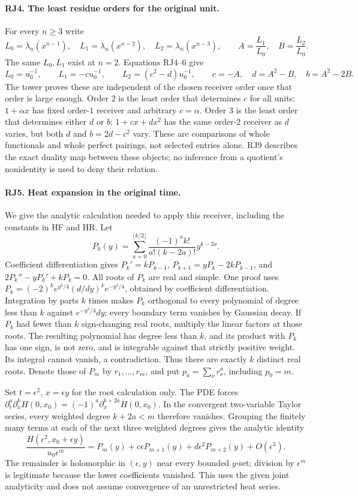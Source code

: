 \paragraph{RJ4. The least residue orders for the original unit.}
For every $n\ge3$ write
\[
 L_0=\lambda_n(x^{n-1}),\quad L_1=\lambda_n(x^{n-2}),\quad
 L_2=\lambda_n(x^{n-3}),\qquad A=\frac{L_1}{L_0},\quad
 B=\frac{L_2}{L_0}.
 \tag{RJ10}
\]
The same $L_0,L_1$ exist at $n=2$. Equations RJ4--6 give
\[
 L_0=u_0^{-1},\qquad L_1=-cu_0^{-1},\qquad
 L_2=(c^2-d)u_0^{-1},
 \qquad\boxed{c=-A,\quad d=A^2-B,\quad b=A^2-2B.}
 \tag{RJ11}
\]
The tower proves these are independent of the chosen receiver order
once that order is large enough. Order $2$ is the least order that
determines $c$ for all units: $1+\alpha x$ has fixed order-$1$
receiver and arbitrary $c=\alpha$. Order $3$ is the least order
that determines either $d$ or $b$: $1+c x+d x^2$ has the same
order-$2$ receiver as $d$ varies, but both $d$ and $b=2d-c^2$
vary. These are comparisons of whole functionals and whole perfect
pairings, not selected entries alone. RJ9 describes the exact
duality map between these objects; no inference from a quotient's
nonidentity is used to deny their relation.

\paragraph{RJ5. Heat expansion in the original time.}
We give the analytic calculation needed to apply this receiver,
including the constants in HF and HR. Let
\[
 P_k(y)=\sum_{a=0}^{\lfloor k/2\rfloor}
       \frac{(-1)^ak!}{a!(k-2a)!}y^{k-2a}.
 \tag{RJ12}
\]
Coefficient differentiation gives
$P_k'=kP_{k-1}$,
$P_{k+1}=yP_k-2kP_{k-1}$, and
$2P_k''-yP_k'+kP_k=0$.
All roots of $P_k$ are real and simple. One proof uses
$P_k=(-2)^ke^{y^2/4}(d/dy)^ke^{-y^2/4}$, obtained by coefficient
differentiation. Integration by parts $k$ times makes $P_k$
orthogonal to every polynomial of degree less than $k$ against
$e^{-y^2/4}dy$; every boundary term vanishes by Gaussian decay.
If $P_k$ had fewer than $k$ sign-changing real roots, multiply the
linear factors at those roots. The resulting polynomial has degree
less than $k$, and its product with $P_k$ has one sign, is not zero,
and is integrable against that strictly positive weight. Its integral
cannot vanish, a contradiction. Thus there are exactly $k$ distinct
real roots. Denote those of $P_m$ by $r_1,\ldots,r_m$, and put
$p_a=\sum_\nu r_\nu^a$, including $p_0=m$.

Set $t=\epsilon^2$, $x=\epsilon y$ for the root calculation only.
The PDE forces
$\partial_t^a\partial_x^kH(0,x_0)=(-1)^a
\partial_x^{k+2a}H(0,x_0)$.
In the convergent two-variable Taylor series, every weighted degree
$k+2a<m$ therefore vanishes. Grouping the finitely many terms at each
of the next three weighted degrees gives the analytic identity
\[
 \frac{H(\epsilon^2,x_0+\epsilon y)}{u_0\epsilon^m}
   =P_m(y)+c\epsilon P_{m+1}(y)
        +d\epsilon^2P_{m+2}(y)+O(\epsilon^3).
 \tag{RJ13}
\]
The remainder is holomorphic in $(\epsilon,y)$ near every bounded
$y$-set; division by $\epsilon^m$ is legitimate because the lower
coefficients vanished. This uses the given joint analyticity and
does not assume convergence of an unrestricted heat series.

